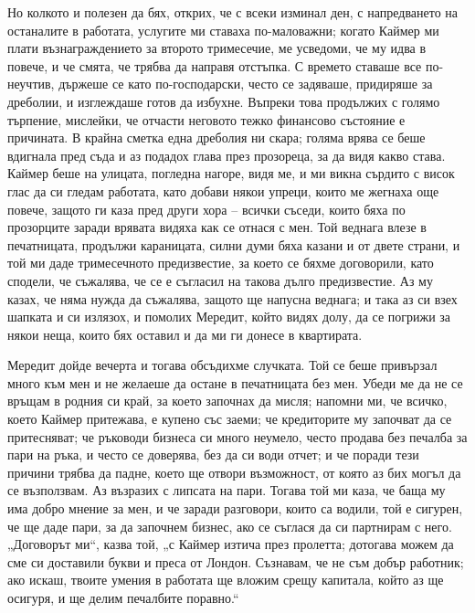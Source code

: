 \documentclass[12pt]{book}
\begin{document}
Но колкото и полезен да бях, открих, че с всеки изминал ден, с напредването на останалите в работата, услугите ми ставаха по-маловажни; когато Каймер ми плати възнаграждението за второто тримесечие, ме усведоми, че му идва в повече, и че смята, че трябва да направя отстъпка. С времето ставаше все по-неучтив, държеше се като по-господарски, често се задяваше, придиряше за дреболии, и изглеждаше готов да избухне. Въпреки това продължих с голямо търпение, мислейки, че отчасти неговото тежко финансово състояние е причината. В крайна сметка една дреболия ни скара; голяма врява се беше вдигнала пред съда и аз подадох глава през прозореца, за да видя какво става. Каймер беше на улицата, погледна нагоре, видя ме, и ми викна сърдито с висок глас да си гледам работата, като добави някои упреци, които ме жегнаха още повече, защото ги каза пред други хора – всички съседи, които бяха по прозорците заради врявата видяха как се отнася с мен. Той веднага влезе в печатницата, продължи караницата, силни думи бяха казани и от двете страни, и той ми даде тримесечното предизвестие, за което се бяхме договорили, като сподели, че съжалява, че се е съгласил на такова дълго предизвестие. Аз му казах, че няма нужда да съжалява, защото ще напусна веднага; и така аз си взех шапката и си излязох, и помолих Мередит, който видях долу, да се погрижи за някои неща, които бях оставил и да ми ги донесе в квартирата.

Мередит дойде вечерта и тогава обсъдихме случката. Той се беше привързал много към мен и не желаеше да остане в печатницата без мен. Убеди ме да не се връщам в родния си край, за което започнах да мисля; напомни ми, че всичко, което Каймер притежава, е купено със заеми; че кредиторите му започват да се притесняват; че ръководи бизнеса си много неумело, често продава без печалба за пари на ръка, и често се доверява, без да си води отчет; и че поради тези причини трябва да падне, което ще отвори възможност, от която аз бих могъл да се възползвам. Аз възразих с липсата на пари. Тогава той ми каза, че баща му има добро мнение за мен, и че заради разговори, които са водили, той е сигурен, че ще даде пари, за да започнем бизнес, ако се съглася да си партнирам с него. „Договорът ми“, казва той, „с Каймер изтича през пролетта; дотогава можем да сме си доставили букви и преса от Лондон. Съзнавам, че не съм добър работник; ако искаш, твоите умения в работата ще вложим срещу капитала, който аз ще осигуря, и ще делим печалбите поравно.“
\end{document}
